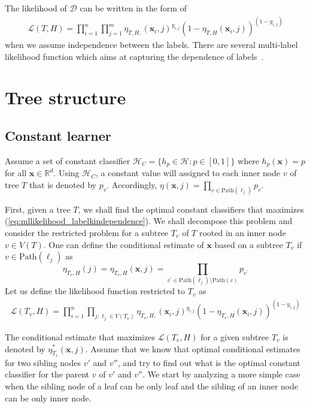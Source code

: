 \documentclass{article}
\newcommand{\R}{\mathbb{R}}
\newcommand{\cD}{\mathcal{D}}
\newcommand{\cH}{\mathcal{H}}
\newcommand{\cL}{\mathcal{L}}
\newcommand{\path}{\text{Path}}
\newcommand{\bx}{\mathbf{x}}
\begin{document}
The likelihood of $\cD$ can be written in the form of
\begin{align}
\cL ( T, H ) = \prod_{i=1}^{n} \prod_{j=1}^m \eta_{T,H,} ( \bx_i , j )^{y_{i,j}} (1-\eta_{T,H} ( \bx_i , j ))^{(1-y_{i,j})}
\label{eq:mllikelihood_labelkindependence}
\end{align}
when we assume independence between the labels. There are several multi-label likelihood function which aims at capturing the dependence of labels~\citep{ZhangS12}. 


\section{Tree structure}

\subsection{Constant learner}


Assume a set of constant classifier $\cH_{C} = \{h_p\in \cH : p\in [0,1] \}$ where $h_p(\bx) = p$ for all $\bx \in \R^d$. Using $\cH_{C}$, a constant value will assigned to each inner node $v$ of tree $T$ that is denoted by $p_v$. Accordingly, $\eta( \bx, j ) = \prod_{v \in \path(\ell_j)} p_v$. 

First, given a tree $T$, we shall find the optimal constant classifiers that maximizes (\ref{eq:mllikelihood_labelkindependence}). We shall decompose this problem and consider the restricted problem for a subtree $T_v$ of $T$ rooted in an inner node $v\in V(T)$. One can define the conditional estimate of $\bx$ based on a subtree $T_v$ if $v\in \path (\ell_j)$ as 
\[
\eta_{T_v, H} ( j) = \eta_{T_v, H} (\bx , j) = \prod_{v^{\prime} \in \path(\ell_j) \setminus \path(v)}  p_{v^{\prime}}
\]
Let us define the likelihood function restricted to $T_v$ as
\begin{align}
\cL ( T_v, H ) = \prod_{i=1}^{n} \prod_{j : \ell_j \in V(T_v) } \eta_{T_v,H,} ( \bx_i , j )^{y_{i,j}} (1-\eta_{T_v,H} ( \bx_i , j ))^{(1-y_{i,j})}
\label{eq:mllikelihood_restricted}
\end{align}

The conditional estimate that maximizes $\cL ( T_v, H )$ for a given subtree $T_v$ is denoted by $\eta_{T_v}^* (\bx , j)$. Assume that we know that optimal conditional estimates for two sibling nodes $v'$ and $v''$, and try to find out what is the optimal constant classifier for the parent $v$ of $v'$ and $v''$. We start by analyzing a more simple case when the sibling node of a leaf can be only leaf and the sibling of an inner node can be only inner node.
\end{document}
